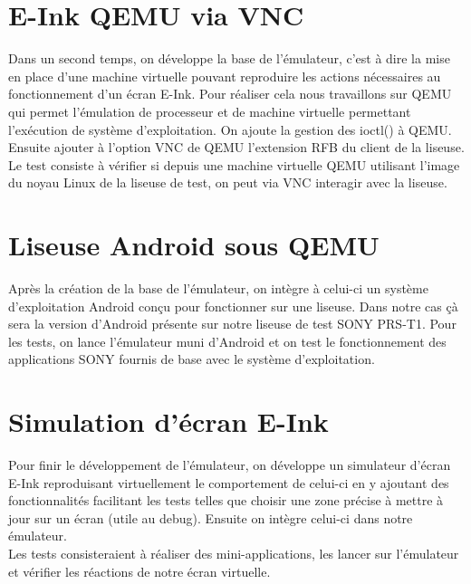 \newpage

\section{E-Ink QEMU via VNC}

Dans un second temps, on développe la base de l'émulateur, c'est à dire la mise en place d'une machine virtuelle pouvant reproduire les actions nécessaires au fonctionnement d'un écran E-Ink. Pour réaliser cela nous travaillons sur QEMU qui permet l'émulation de processeur et de machine virtuelle permettant l'exécution de système d'exploitation. On ajoute la gestion des ioctl() à QEMU. Ensuite ajouter à l'option VNC de QEMU l'extension RFB du client de la liseuse.
\\Le test consiste à vérifier si depuis une machine virtuelle QEMU utilisant l'image du noyau Linux de la liseuse de test, on peut via VNC interagir avec la liseuse. 


\section{Liseuse Android sous QEMU}

Après la création de la base de l'émulateur, on intègre à celui-ci un système d'exploitation Android conçu pour fonctionner sur une liseuse. Dans notre cas çà sera la version d'Android présente sur notre liseuse de test SONY PRS-T1.
Pour les tests, on lance l'émulateur muni d'Android et on test le fonctionnement des applications SONY fournis de base avec le système d'exploitation.

\section{Simulation d'écran E-Ink}

Pour finir le développement de l'émulateur, on développe un simulateur d'écran E-Ink reproduisant virtuellement le comportement de celui-ci en y ajoutant des fonctionnalités facilitant les tests telles que choisir une zone précise à mettre à jour sur un écran (utile au debug). Ensuite on intègre celui-ci dans notre émulateur.
\\Les tests consisteraient à réaliser des mini-applications, les lancer sur l'émulateur et vérifier les réactions de notre écran virtuelle.

